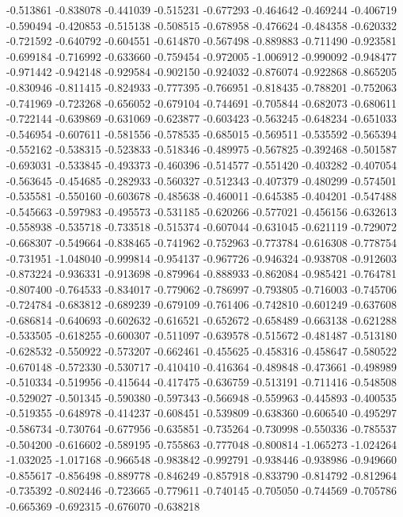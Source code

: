 -0.513861
-0.838078
-0.441039
-0.515231
-0.677293
-0.464642
-0.469244
-0.406719
-0.590494
-0.420853
-0.515138
-0.508515
-0.678958
-0.476624
-0.484358
-0.620332
-0.721592
-0.640792
-0.604551
-0.614870
-0.567498
-0.889883
-0.711490
-0.923581
-0.699184
-0.716992
-0.633660
-0.759454
-0.972005
-1.006912
-0.990092
-0.948477
-0.971442
-0.942148
-0.929584
-0.902150
-0.924032
-0.876074
-0.922868
-0.865205
-0.830946
-0.811415
-0.824933
-0.777395
-0.766951
-0.818435
-0.788201
-0.752063
-0.741969
-0.723268
-0.656052
-0.679104
-0.744691
-0.705844
-0.682073
-0.680611
-0.722144
-0.639869
-0.631069
-0.623877
-0.603423
-0.563245
-0.648234
-0.651033
-0.546954
-0.607611
-0.581556
-0.578535
-0.685015
-0.569511
-0.535592
-0.565394
-0.552162
-0.538315
-0.523833
-0.518346
-0.489975
-0.567825
-0.392468
-0.501587
-0.693031
-0.533845
-0.493373
-0.460396
-0.514577
-0.551420
-0.403282
-0.407054
-0.563645
-0.454685
-0.282933
-0.560327
-0.512343
-0.407379
-0.480299
-0.574501
-0.535581
-0.550160
-0.603678
-0.485638
-0.460011
-0.645385
-0.404201
-0.547488
-0.545663
-0.597983
-0.495573
-0.531185
-0.620266
-0.577021
-0.456156
-0.632613
-0.558938
-0.535718
-0.733518
-0.515374
-0.607044
-0.631045
-0.621119
-0.729072
-0.668307
-0.549664
-0.838465
-0.741962
-0.752963
-0.773784
-0.616308
-0.778754
-0.731951
-1.048040
-0.999814
-0.954137
-0.967726
-0.946324
-0.938708
-0.912603
-0.873224
-0.936331
-0.913698
-0.879964
-0.888933
-0.862084
-0.985421
-0.764781
-0.807400
-0.764533
-0.834017
-0.779062
-0.786997
-0.793805
-0.716003
-0.745706
-0.724784
-0.683812
-0.689239
-0.679109
-0.761406
-0.742810
-0.601249
-0.637608
-0.686814
-0.640693
-0.602632
-0.616521
-0.652672
-0.658489
-0.663138
-0.621288
-0.533505
-0.618255
-0.600307
-0.511097
-0.639578
-0.515672
-0.481487
-0.513180
-0.628532
-0.550922
-0.573207
-0.662461
-0.455625
-0.458316
-0.458647
-0.580522
-0.670148
-0.572330
-0.530717
-0.410410
-0.416364
-0.489848
-0.473661
-0.498989
-0.510334
-0.519956
-0.415644
-0.417475
-0.636759
-0.513191
-0.711416
-0.548508
-0.529027
-0.501345
-0.590380
-0.597343
-0.566948
-0.559963
-0.445893
-0.400535
-0.519355
-0.648978
-0.414237
-0.608451
-0.539809
-0.638360
-0.606540
-0.495297
-0.586734
-0.730764
-0.677956
-0.635851
-0.735264
-0.730998
-0.550336
-0.785537
-0.504200
-0.616602
-0.589195
-0.755863
-0.777048
-0.800814
-1.065273
-1.024264
-1.032025
-1.017168
-0.966548
-0.983842
-0.992791
-0.938446
-0.938986
-0.949660
-0.855617
-0.856498
-0.889778
-0.846249
-0.857918
-0.833790
-0.814792
-0.812964
-0.735392
-0.802446
-0.723665
-0.779611
-0.740145
-0.705050
-0.744569
-0.705786
-0.665369
-0.692315
-0.676070
-0.638218
